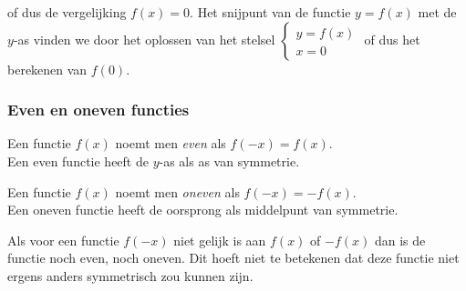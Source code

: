  of dus de vergelijking $f(x)=0$. Het snijpunt van de functie $y=f(x)$ met de $y$-as vinden
we door het oplossen van het stelsel 
$\begin{cases}
y=f(x)\\
x=0
\end{cases}$ of dus het berekenen van $f(0)$.


%
%
%


\subsubsection{Even en oneven functies}


\begin{definitie}
	Een functie $f(x)$ noemt men \emph{even} als $f(-x)=f(x)$.
\\
Een even functie heeft de $y$-as als as van symmetrie.


Een functie $f(x)$ noemt men \emph{oneven} als $f(-x)=-f(x)$.
\\
Een oneven functie heeft de oorsprong als middelpunt van symmetrie.

\end{definitie}

Als voor een functie $f(-x)$ niet gelijk is aan $f(x)$
of $-f(x)$ dan is de functie noch even, noch oneven. Dit hoeft niet
te betekenen dat deze functie niet ergens anders symmetrisch zou kunnen
zijn.




